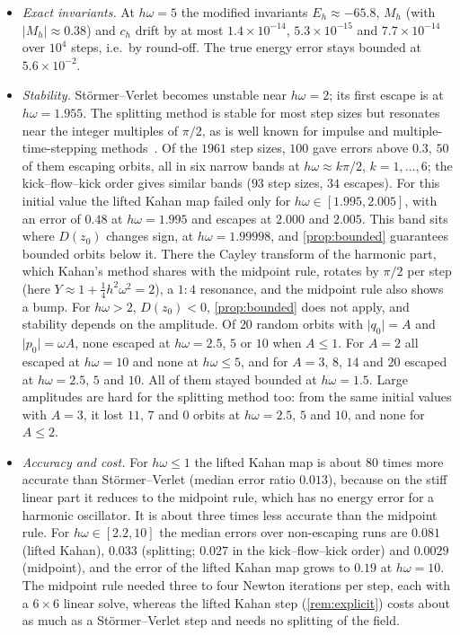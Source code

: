 \documentclass[11pt,a4paper]{article}
\theoremstyle{definition}
\theoremstyle{remark}
\begin{document}
\begin{itemize}[leftmargin=*]
\item \emph{Exact invariants.} At $h\omega=5$ the modified invariants $E_h\approx-65.8$, $M_h$ (with
  $\lvert M_h\rvert\approx0.38$) and $c_h$ drift by at most $1.4\times10^{-14}$, $5.3\times10^{-15}$ and
  $7.7\times10^{-14}$ over $10^4$ steps, i.e.\ by round-off. The true energy error stays bounded at
  $5.6\times10^{-2}$.
\item \emph{Stability.} St\"ormer--Verlet becomes unstable near $h\omega=2$; its first escape is at
  $h\omega=1.955$. The splitting method is stable for most step sizes but resonates near the integer multiples of
  $\pi/2$, as is well known for impulse and multiple-time-stepping methods~\cite{BiesiadeckiSkeel93,GSS99}. Of
  the $1961$ step sizes, $100$ gave errors above $0.3$, $50$ of them escaping orbits, all in six narrow bands at
  $h\omega\approx k\pi/2$, $k=1,\dots,6$; the kick--flow--kick order gives similar bands ($93$ step sizes, $34$
  escapes). For this initial value the lifted Kahan map failed only for $h\omega\in[1.995,2.005]$, with an error
  of $0.48$ at $h\omega=1.995$ and escapes at $2.000$ and $2.005$. This band sits where $D(z_0)$ changes sign, at
  $h\omega=1.99998$, and \cref{prop:bounded} guarantees bounded orbits below it. There the Cayley transform of the
  harmonic part, which Kahan's method shares with the midpoint rule, rotates by $\pi/2$ per step (here
  $Y\approx1+\frac14h^2\omega^2=2$), a $1{:}4$ resonance, and the midpoint rule also shows a bump. For
  $h\omega>2$, $D(z_0)<0$, \cref{prop:bounded} does not apply, and stability depends on the amplitude. Of $20$
  random orbits with $\lvert q_0\rvert=A$ and $\lvert p_0\rvert=\omega A$, none escaped at $h\omega=2.5$, $5$ or
  $10$ when $A\le1$. For $A=2$ all escaped at $h\omega=10$ and none at $h\omega\le5$, and for $A=3$, $8$, $14$
  and $20$ escaped at $h\omega=2.5$, $5$ and $10$. All of them stayed bounded at $h\omega=1.5$. Large amplitudes
  are hard for the splitting method too: from the same initial values with $A=3$, it lost $11$, $7$ and $0$
  orbits at $h\omega=2.5$, $5$ and $10$, and none for $A\le2$.
\item \emph{Accuracy and cost.} For $h\omega\le1$ the lifted Kahan map is about $80$ times more accurate than
  St\"ormer--Verlet (median error ratio $0.013$), because on the stiff linear part it reduces to the midpoint
  rule, which has no energy error for a harmonic oscillator. It is about three times less accurate than the
  midpoint rule. For $h\omega\in[2.2,10]$ the median errors over non-escaping runs are $0.081$ (lifted Kahan),
  $0.033$ (splitting; $0.027$ in the kick--flow--kick order) and $0.0029$ (midpoint), and the error of the lifted
  Kahan map grows to $0.19$ at $h\omega=10$. The midpoint rule needed three to four Newton iterations per step,
  each with a $6\times6$ linear solve, whereas the lifted Kahan step (\cref{rem:explicit}) costs about as much as a
  St\"ormer--Verlet step and needs no splitting of the field.
\end{itemize}
\end{document}
